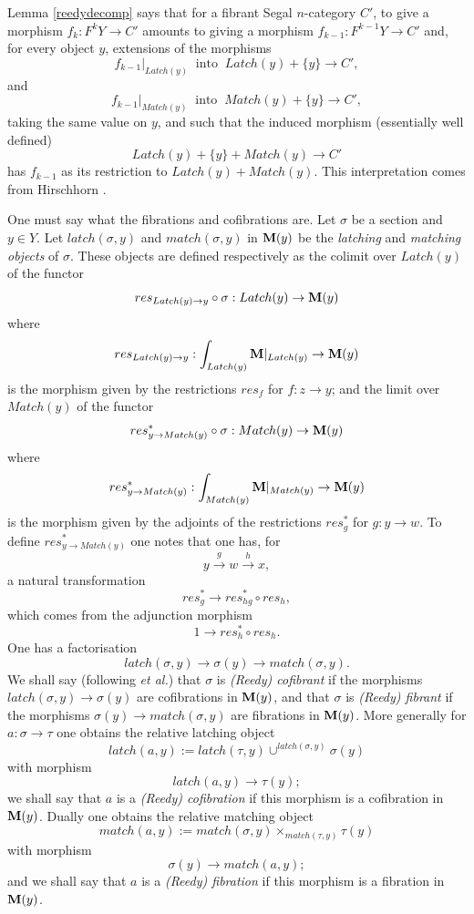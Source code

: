 Lemma \ref{reedydecomp} says that for a fibrant Segal $n$-category $C'$, to
give a morphism
$f_k:F^kY\rightarrow C'$ amounts to giving a morphism
$f_{k-1}: F^{k-1}Y\rightarrow C'$ and, for every object $y$, extensions of the
morphisms
$$
f_{k-1}|_{Latch(y)} \;\; \mbox{into}\;\; Latch(y)+\{ y\} \rightarrow C',
$$
and
$$
f_{k-1}|_{Match(y)} \;\; \mbox{into}\;\; Match(y)+\{ y\} \rightarrow C',
$$
taking the same value on $y$,
and such that the induced morphism (essentially well defined)
$$
Latch(y)+ \{ y\} + Match(y)\rightarrow C'
$$
has $f_{k-1}$ as its restriction to $Latch(y)+Match(y)$.
This interpretation comes from Hirschhorn \cite{Hirschhorn}.



One must say what the fibrations and cofibrations are.
Let $\sigma$ be a section and $y\in Y$.
Let $latch(\sigma , y)$ and $match(\sigma , y)$ in ${\bf M} (y)$ be the {\em
latching} and {\em matching objects} of $\sigma$. These objects are defined
respectively
as the colimit over $Latch(y)$ of the functor
$$
res_{Latch(y)\rightarrow y} \circ \sigma : Latch(y)\rightarrow {\bf M} (y)
$$
where
$$
res_{Latch(y)\rightarrow y} : \int _{Latch(y)}{\bf M} |_{Latch(y)} \rightarrow {\bf M}
(y)
$$
is the morphism given by the restrictions $res_f$ for $f: z\rightarrow y$;
and the limit over $Match(y)$ of the functor
$$
res_{y\rightarrow Match(y)} ^{\ast}\circ \sigma : Match(y)\rightarrow {\bf M}
(y)
$$
where
$$
res_{y\rightarrow Match(y)}^{\ast} : \int _{Match(y)}{\bf M} |_{Match(y)}
\rightarrow {\bf M} (y)
$$
is the morphism given by the adjoints of the restrictions
$res_g^{\ast}$ for $g: y\rightarrow w$.
To define $res_{y\rightarrow Match(y)}^{\ast}$ one notes that one has, for
$$
y\stackrel{g}{\rightarrow} w \stackrel{h}{\rightarrow} x,
$$
a natural transformation
$$
res_g^{\ast} \rightarrow res _{hg}^{\ast} \circ res_h,
$$
which comes from the adjunction morphism
$$
1\rightarrow res_h^{\ast} \circ res_h.
$$
One has a factorisation
$$
latch(\sigma ,y)\rightarrow \sigma (y) \rightarrow match(\sigma , y).
$$
We shall say (following \cite{Reedy} \cite{Hirschhorn} \cite{DHK} {\em et al.})
that
$\sigma$ is {\em (Reedy) cofibrant} if the morphisms $latch(\sigma
,y)\rightarrow \sigma (y)$ are cofibrations in ${\bf M} (y)$, and that
$\sigma$
is {\em (Reedy) fibrant} if
the morphisms $\sigma (y)\rightarrow match(\sigma ,y)$ are fibrations in
${\bf M} (y)$. More generally for $a:\sigma \rightarrow \tau$
one obtains the relative latching object
$$
latch(a,y):= latch(\tau , y) \cup ^{latch(\sigma , y)}\sigma (y)
$$
with morphism
$$
latch (a,y)\rightarrow \tau (y);
$$
we shall say that $a$ is a {\em (Reedy) cofibration} if this morphism is a
cofibration in ${\bf M} (y)$. Dually one obtains the relative matching object
$$
match (a,y):= match (\sigma ,y)\times _{match(\tau , y)}\tau (y)
$$
with morphism
$$
\sigma (y)\rightarrow match(a,y);
$$
and we shall say that $a$ is a {\em (Reedy) fibration} if this morphism is a
fibration in ${\bf M} (y)$.

